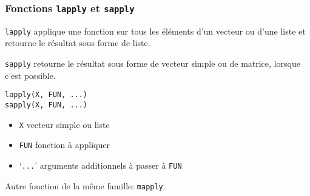 \begin{frame}[fragile=singleslide]
  \frametitle{Fonctions \texttt{lapply} et \texttt{sapply}}

  \texttt{lapply} applique une fonction sur tous les éléments d'un
  \alert{vecteur} ou d'une \alert{liste} et retourne le résultat sous
  forme de liste.

  \texttt{sapply} retourne le résultat sous forme de vecteur simple ou
  de matrice, lorsque c'est possible.
  \begin{Schunk}
    \verb=lapply(X, FUN, ...)= \\
    \verb=sapply(X, FUN, ...)=
  \end{Schunk}
  \begin{itemize}
  \item \texttt{X} vecteur simple ou liste
  \item \texttt{FUN} fonction à appliquer
  \item `\texttt{...}' arguments additionnels à passer à \texttt{FUN}
  \end{itemize}

  Autre fonction de la même famille: \texttt{mapply}.
\end{frame}

